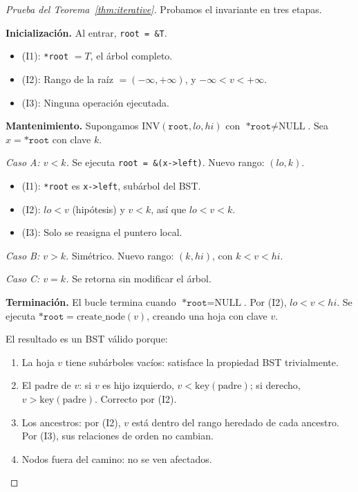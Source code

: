 \documentclass[11pt, letterpaper]{article}
\theoremstyle{definition}
\theoremstyle{plain}
\theoremstyle{remark}
\begin{document}
\begin{proof}[Prueba del Teorema~\ref{thm:iterative}]
Probamos el invariante en tres etapas.

\textbf{Inicialización.} Al entrar, \texttt{root = \&T}.
\begin{itemize}
  \item (I1): \texttt{*root} $= T$, el árbol completo. \checkmark
  \item (I2): Rango de la raíz $= (-\infty, +\infty)$, y $-\infty < v < +\infty$. \checkmark
  \item (I3): Ninguna operación ejecutada. \checkmark
\end{itemize}

\textbf{Mantenimiento.} Supongamos $\text{INV}(\texttt{root}, lo, hi)$
con $\texttt{*root} \neq \text{NULL}$. Sea $x = \texttt{*root}$ con
clave $k$.

\emph{Caso A: $v < k$.} Se ejecuta \texttt{root = \&(x->left)}.
Nuevo rango: $(lo, k)$.
\begin{itemize}
  \item (I1): \texttt{*root} es \texttt{x->left}, subárbol del BST. \checkmark
  \item (I2): $lo < v$ (hipótesis) y $v < k$, así que $lo < v < k$. \checkmark
  \item (I3): Solo se reasigna el puntero local. \checkmark
\end{itemize}

\emph{Caso B: $v > k$.} Simétrico. Nuevo rango: $(k, hi)$, con
$k < v < hi$. \checkmark

\emph{Caso C: $v = k$.} Se retorna sin modificar el árbol. \checkmark

\textbf{Terminación.} El bucle termina cuando $\texttt{*root} = \text{NULL}$.
Por (I2), $lo < v < hi$. Se ejecuta $\texttt{*root} = \text{create\_node}(v)$,
creando una hoja con clave $v$.

El resultado es un BST válido porque:
\begin{enumerate}
  \item La hoja $v$ tiene subárboles vacíos: satisface la propiedad BST
    trivialmente.
  \item El padre de $v$: si $v$ es hijo izquierdo, $v < \text{key}(\text{padre})$;
    si derecho, $v > \text{key}(\text{padre})$. Correcto por (I2).
  \item Los ancestros: por (I2), $v$ está dentro del rango heredado de
    cada ancestro. Por (I3), sus relaciones de orden no cambian.
  \item Nodos fuera del camino: no se ven afectados.
\end{enumerate}
\end{proof}
\end{document}
